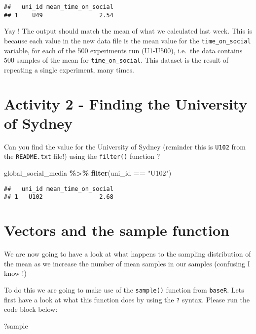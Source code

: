 \documentclass[
]{book}
\newenvironment{Shaded}{\begin{snugshade}}{\end{snugshade}}
\newcommand{\FunctionTok}[1]{\textcolor[rgb]{0.13,0.29,0.53}{\textbf{#1}}}
\newcommand{\NormalTok}[1]{#1}
\newcommand{\SpecialCharTok}[1]{\textcolor[rgb]{0.81,0.36,0.00}{\textbf{#1}}}
\newcommand{\StringTok}[1]{\textcolor[rgb]{0.31,0.60,0.02}{#1}}
\begin{document}
\begin{verbatim}
##   uni_id mean_time_on_social
## 1    U49                2.54
\end{verbatim}

Yay ! The output should match the mean of what we calculated last week. This is because each value in the new data file is the mean value for the \texttt{time\_on\_social} variable, for each of the 500 experiments run (U1-U500), i.e.~the data contains 500 samples of the mean for \texttt{time\_on\_social}. This dataset is the result of repeating a single experiment, many times.

\section{Activity 2 - Finding the University of Sydney}\label{activity-2---finding-the-university-of-sydney}

Can you find the value for the University of Sydney (reminder this is \texttt{U102} from the \texttt{README.txt} file!) using the \texttt{filter()} function ?

\begin{Shaded}
\begin{Highlighting}[]
\NormalTok{global\_social\_media }\SpecialCharTok{\%\textgreater{}\%} 
  \FunctionTok{filter}\NormalTok{(uni\_id }\SpecialCharTok{==} \StringTok{"U102"}\NormalTok{)}
\end{Highlighting}
\end{Shaded}

\begin{verbatim}
##   uni_id mean_time_on_social
## 1   U102                2.68
\end{verbatim}

\section{Vectors and the sample function}\label{vectors-and-the-sample-function}

We are now going to have a look at what happens to the sampling distribution of the mean as we increase the number of mean samples in our samples (confusing I know !)

To do this we are going to make use of the \texttt{sample()} function from \texttt{baseR}. Lets first have a look at what this function does by using the \texttt{?} syntax. Please run the code block below:

\begin{Shaded}
\begin{Highlighting}[]
\NormalTok{?sample}
\end{Highlighting}
\end{Shaded}
\end{document}
